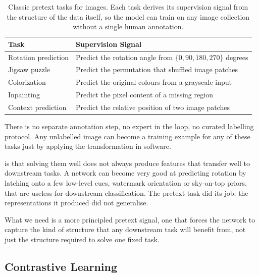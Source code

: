 \begin{table}[ht]
\centering
\begin{tabular}{p{}p{}}
    \toprule
    \textbf{Task} & \textbf{Supervision Signal} \\
    \midrule
    Rotation prediction & Predict the rotation angle from $\{0, 90, 180, 270\}$ degrees \\
    Jigsaw puzzle       & Predict the permutation that shuffled image patches \\
    Colorization        & Predict the original colours from a grayscale input \\
    Inpainting          & Predict the pixel content of a missing region \\
    Context prediction  & Predict the relative position of two image patches \\
    \bottomrule
\end{tabular}
\vspace{2em}
\caption{Classic pretext tasks for images. Each task derives its supervision signal from the structure of the data itself, so the model can train on any image collection without a single human annotation.}
\label{tab:pretext_tasks}
\end{table}

There is no separate annotation step, no expert in the loop, no curated labelling protocol.
Any unlabelled image can become a training example for any of these tasks just by applying the transformation in software.

 is that solving them well does not always produce features that transfer well to downstream tasks.
A network can become very good at predicting rotation by latching onto a few low-level cues, watermark orientation or sky-on-top priors, that are useless for downstream classification.
The pretext task did its job; the representations it produced did not generalise.

What we need is a more principled pretext signal, one that forces the network to capture the kind of structure that any downstream task will benefit from, not just the structure required to solve one fixed task.


\subsection{Contrastive Learning}


